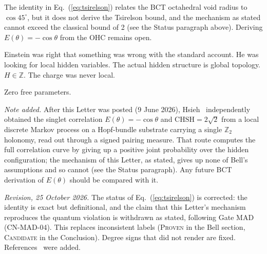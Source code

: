 \documentclass[aps,prl,twocolumn,showpacs,preprintnumbers]{revtex4-2}
\begin{document}
The identity in Eq.~(\ref{eq:tsirelson}) relates the BCT
octahedral void radius to $\cos 45^\circ$, but it does not
derive the Tsirelson bound, and the mechanism as stated
cannot exceed the classical bound of 2 (see the Status
paragraph above). Deriving $E(\theta) = -\cos\theta$ from
the OHC remains open.

Einstein was right that something was wrong with the
standard account. He was looking for local hidden variables.
The actual hidden structure is global topology.
$H \in \mathbb{Z}$. The charge was never local.

Zero free parameters.

\textit{Note added.} After this Letter was posted
(9 June 2026), Hsieh~\cite{hsiehHFT,hsiehZ2} independently
obtained the singlet correlation $E(\theta) = -\cos\theta$
and $\mathrm{CHSH} = 2\sqrt{2}$ from a local discrete Markov
process on a Hopf-bundle substrate carrying a single
$\mathbb{Z}_2$ holonomy, read out through a signed pairing
measure. That route computes the full correlation curve by
giving up a positive joint probability over the hidden
configuration; the mechanism of this Letter, as stated,
gives up none of Bell's assumptions and so cannot (see the
Status paragraph). Any future BCT derivation of $E(\theta)$
should be compared with it.

\textit{Revision, 25 October 2026.} The status of
Eq.~(\ref{eq:tsirelson}) is corrected: the identity is
exact but definitional, and the claim that this Letter's
mechanism reproduces the quantum violation is withdrawn as
stated, following Gate MAD (CN-MAD-04). This replaces
inconsistent labels (\textsc{Proven} in the Bell section,
\textsc{Candidate} in the Conclusion). Degree signs that did
not render are fixed.
References~\cite{mosseri,christian,hsiehHFT,hsiehZ2}
were added.
\end{document}
